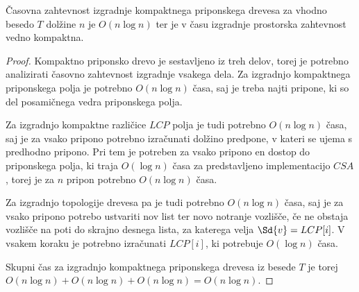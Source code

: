 \begin{izr} \label{izr:izgradnjaCST}
    Časovna zahtevnost izgradnje kompaktnega priponskega drevesa za vhodno besedo $T$ dolžine $n$ je $O(n\log{n})$ ter je v času izgradnje prostorska zahtevnost vedno kompaktna.
\end{izr}

\begin{proof}
    Kompaktno priponsko drevo je sestavljeno iz treh delov, torej je potrebno analizirati časovno zahtevnost izgradnje vsakega dela. Za izgradnjo kompaktnega priponskega polja je potrebno $O(n\log{n})$ časa, saj je treba najti pripone, ki so del posamičnega vedra priponskega polja.
    
    Za izgradnjo kompaktne različice $LCP$ polja je tudi potrebno $O(n\log{n})$ časa, saj je za vsako pripono potrebno izračunati dolžino predpone, v kateri se ujema s predhodno pripono. Pri tem je potreben za vsako pripono en dostop do priponskega polja, ki traja $O(\log{n})$ časa za predstavljeno implementacijo $CSA$, torej je za $n$ pripon potrebno $O(n\log{n})$ časa.

    Za izgradnjo topologije drevesa pa je tudi potrebno $O(n\log{n})$ časa, saj je za vsako pripono potrebo ustvariti nov list ter novo notranje vozlišče, če ne obstaja vozlišče na poti do skrajno desnega lista, za katerega velja $\Sd{v}=LCP[i]$. V vsakem koraku je potrebno izračunati $LCP[i]$, ki potrebuje $O(\log{n})$ časa.

    Skupni čas za izgradnjo kompaktnega priponskega drevesa iz besede $T$ je torej $O(n\log{n})+O(n\log{n})+O(n\log{n})=O(n\log{n})$.
\end{proof}

